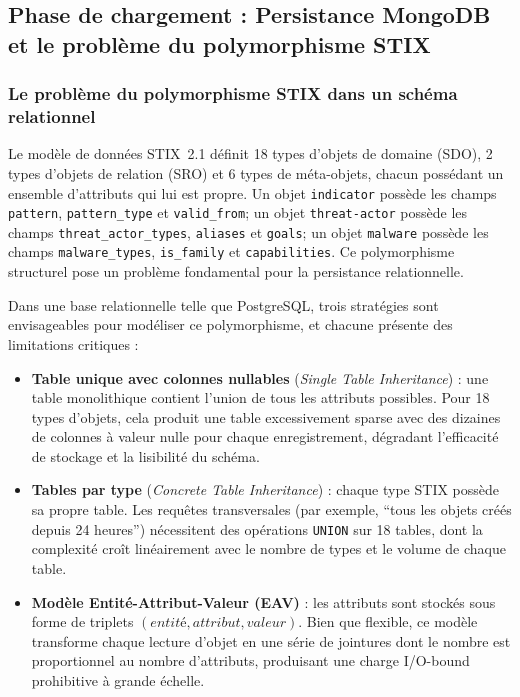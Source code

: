 \subsection{Phase de chargement : Persistance MongoDB et le problème du polymorphisme STIX}

\subsubsection{Le problème du polymorphisme STIX dans un schéma relationnel}

Le modèle de données STIX~2.1 définit 18 types d'objets de domaine (SDO), 2 types d'objets de relation (SRO) et 6 types de méta-objets, chacun possédant un ensemble d'attributs qui lui est propre. Un objet \texttt{indicator} possède les champs \texttt{pattern}, \texttt{pattern\_type} et \texttt{valid\_from}; un objet \texttt{threat-actor} possède les champs \texttt{threat\_actor\_types}, \texttt{aliases} et \texttt{goals}; un objet \texttt{malware} possède les champs \texttt{malware\_types}, \texttt{is\_family} et \texttt{capabilities}. Ce polymorphisme structurel pose un problème fondamental pour la persistance relationnelle.

Dans une base relationnelle telle que PostgreSQL, trois stratégies sont envisageables pour modéliser ce polymorphisme, et chacune présente des limitations critiques :

\begin{itemize}
    \item \textbf{Table unique avec colonnes nullables} (\textit{Single Table Inheritance}) : une table monolithique contient l'union de tous les attributs possibles. Pour 18 types d'objets, cela produit une table excessivement sparse avec des dizaines de colonnes à valeur nulle pour chaque enregistrement, dégradant l'efficacité de stockage et la lisibilité du schéma.
    \item \textbf{Tables par type} (\textit{Concrete Table Inheritance}) : chaque type STIX possède sa propre table. Les requêtes transversales (par exemple, ``tous les objets créés depuis 24 heures'') nécessitent des opérations \texttt{UNION} sur 18 tables, dont la complexité croît linéairement avec le nombre de types et le volume de chaque table.
    \item \textbf{Modèle Entité-Attribut-Valeur (EAV)} : les attributs sont stockés sous forme de triplets $(entité, attribut, valeur)$. Bien que flexible, ce modèle transforme chaque lecture d'objet en une série de jointures dont le nombre est proportionnel au nombre d'attributs, produisant une charge I/O-bound prohibitive à grande échelle.
\end{itemize}


